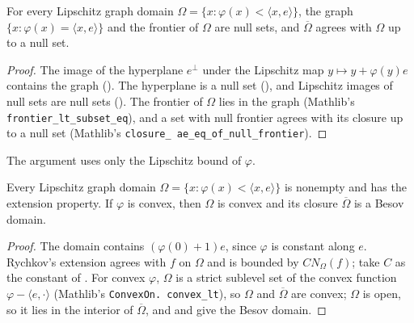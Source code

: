 \begin{lemma}
\label{lem:lipschitz-graph-null}
\leanok
{}
For every Lipschitz graph domain $\Omega = \{x : \varphi(x) < \langle x, e \rangle\}$, the graph
$\{x : \varphi(x) = \langle x, e \rangle\}$ and the frontier of $\Omega$ are null sets, and
$\overline{\Omega}$ agrees with $\Omega$ up to a null set.
\end{lemma}

\begin{proof}
\leanok
The image of the hyperplane $e^\perp$ under the Lipschitz map $y \mapsto y + \varphi(y) e$ contains
the graph (). The hyperplane is a null set
(), and Lipschitz images of null sets are null sets
(). The frontier of $\Omega$ lies in the graph (Mathlib's
\texttt{frontier\_\allowbreak lt\_\allowbreak subset\_\allowbreak eq}), and a set with null
frontier agrees with its closure up to a null set (Mathlib's \texttt{closure\_\allowbreak
ae\_\allowbreak eq\_\allowbreak of\_\allowbreak null\_\allowbreak frontier}).
\end{proof}

The argument uses only the Lipschitz bound of $\varphi$.

\begin{theorem}
\label{thm:graph-besov-domain}
\leanok
{}
Every Lipschitz graph domain $\Omega = \{x : \varphi(x) < \langle x, e \rangle\}$ is nonempty and
has the extension property. If $\varphi$ is convex, then $\Omega$ is convex and its closure
$\overline{\Omega}$ is a Besov domain.
\end{theorem}

\begin{proof}
\leanok
The domain contains $(\varphi(0) + 1) e$, since $\varphi$ is constant along $e$. Rychkov's extension
agrees with $f$ on $\Omega$ and is bounded by $C N_\Omega(f)$; take $C$ as the constant of
. For convex $\varphi$, $\Omega$ is a strict sublevel set of the convex
function $\varphi - \langle e, \cdot \rangle$ (Mathlib's \texttt{ConvexOn.\allowbreak
convex\_\allowbreak lt}), so $\Omega$ and $\overline{\Omega}$ are convex; $\Omega$ is open, so it
lies in the interior of $\overline{\Omega}$, and  and
 give the Besov domain.
\end{proof}

